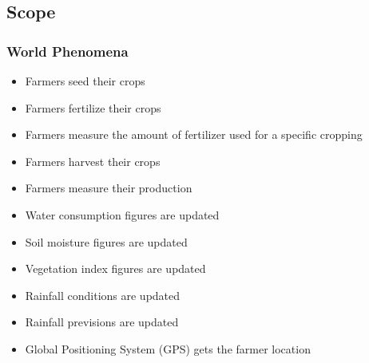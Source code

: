 \subsection{Scope}

\subsubsection{World Phenomena}
\begin{itemize}
	\item
	Farmers seed their crops
	\item
	Farmers fertilize their crops
	\item
	Farmers measure the amount of fertilizer used for a specific cropping
	\item
	Farmers harvest their crops
	\item
	Farmers measure their production
	\item
	Water consumption figures are updated 
	\item
	Soil moisture figures are updated
	\item
	Vegetation index figures are updated
	\item
	Rainfall conditions are updated
	\item
	Rainfall previsions are updated
	\item
	Global Positioning System (GPS) gets the farmer location
\end{itemize}

